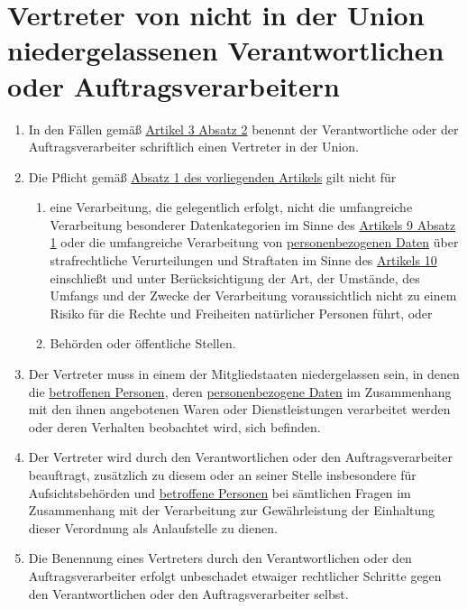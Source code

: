\chapter{Vertreter von nicht in der Union niedergelassenen Verantwortlichen oder Auftragsverarbeitern}
\label{ch:27}


\begin{enumerate}

  \item In den Fällen gemäß \hyperref[itm:03-2]{Artikel 3 Absatz 2} benennt der Verantwortliche oder der
   Auftragsverarbeiter schriftlich einen Vertreter in der Union.
  \label{itm:27-1}

  \item Die Pflicht gemäß \hyperref[itm:27-1]{Absatz 1 des vorliegenden Artikels} gilt nicht für
  \label{itm:27-2}

  \begin{enumerate}
  
    \item eine Verarbeitung, die gelegentlich erfolgt, nicht die umfangreiche Verarbeitung besonderer Datenkategorien im
     Sinne des \hyperref[itm:09-1]{Artikels 9 Absatz 1} oder die umfangreiche Verarbeitung von \hyperref[itm:04-1]{personenbezogenen Daten}
     über strafrechtliche Verurteilungen und Straftaten im Sinne des \hyperref[ch:10]{Artikels 10} einschließt und
     unter Berücksichtigung der Art, der Umstände, des Umfangs und der Zwecke der Verarbeitung voraussichtlich nicht zu
     einem Risiko für die Rechte und Freiheiten natürlicher Personen führt, oder
    \label{itm:27-2a}

    \item Behörden oder öffentliche Stellen.
    \label{itm:27-2b}

  \end{enumerate}

  \item Der Vertreter muss in einem der Mitgliedstaaten niedergelassen sein, in denen die \hyperref[itm:04-1]{betroffenen Personen}, deren
   \hyperref[itm:04-1]{personenbezogene Daten} im Zusammenhang mit den ihnen angebotenen Waren oder Dienstleistungen verarbeitet werden oder
   deren Verhalten beobachtet wird, sich befinden.
  \label{itm:27-3}

  \item Der Vertreter wird durch den Verantwortlichen oder den Auftragsverarbeiter beauftragt, zusätzlich zu diesem oder
   an seiner Stelle insbesondere für Aufsichtsbehörden und \hyperref[itm:04-1]{betroffene Personen} bei sämtlichen Fragen im Zusammenhang
   mit der Verarbeitung zur Gewährleistung der Einhaltung dieser Verordnung als Anlaufstelle zu dienen.
  \label{itm:27-4}

  \item Die Benennung eines Vertreters durch den Verantwortlichen oder den Auftragsverarbeiter erfolgt unbeschadet
   etwaiger rechtlicher Schritte gegen den Verantwortlichen oder den Auftragsverarbeiter selbst.
  \label{itm:27-5}

\end{enumerate}


